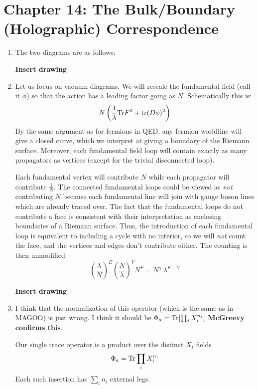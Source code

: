 \documentclass[11pt, class=article, crop=false]{standalone}
\begin{document}
\section*{Chapter 14: The Bulk/Boundary (Holographic) Correspondence} %
\label{sec:chapter_14_the_bulk_boundary_holographic_correspondence}

\begin{enumerate}
	\item The two diagrams are as follows:
	
	\begin{center}
		\textbf{Insert drawing}
	\end{center}
	
	\item Let us focus on vacuum diagrams. We will rescale the fundamental field (call it $\phi$) so that the action has a leading factor going as $N$. Schematically this is:
	\[
		N\left(\frac{1}{\lambda} \mathrm{Tr} F^2 + \mathrm{tr} (D \phi)^2  \right)
	\]
	 By the same argument as for fermions in QED, any fermion worldline will give a closed curve, which we interpret at giving a boundary of the Riemann surface. Moreover, each fundamental field loop will contain exactly as many propagators as vertices (except for the trivial disconnected loop). 
	
	Each fundamental vertex will contribute $N$ while each propagator will contribute $\frac{1}{N}$. The connected fundamental loops could be viewed as \emph{not} contributing $N$ because each fundamental line will join with gauge boson lines which are already traced over. The fact that the fundamental loops do not contribute a face is consistent with their interpretation as enclosing boundaries of a Riemann surface. Thus, the introduction of each fundamental loop is equivalent to including a cycle with no interior, so we will \emph{not} count the face, and the vertices and edges don't contribute either. The  counting is then unmodified
	\[
		\left(\frac{\lambda}{N} \right)^E \left(\frac{N}{\lambda} \right)^V N^F  = N^{\chi}\, \lambda^{E - V}
	\]
	
	\begin{center}
		\textbf{Insert drawing}
	\end{center}
	
	\item I think that the normalization of this operator (which is the same as in MAGOO) is just wrong. I think it should be $\Phi_a = \mathrm{Tr}[\prod_i X_i^{n_i}]$
	\textbf{McGreevy confirms this}.
	
	Our single trace operator is a product over the distinct $X_i$ fields
	\[
		\Phi_a = \mathrm{Tr} \prod_{i} X_i^{n_i}
	\]
	Each such insertion has $\sum_i n_i$ external legs.
		

\end{enumerate}
\end{document}
